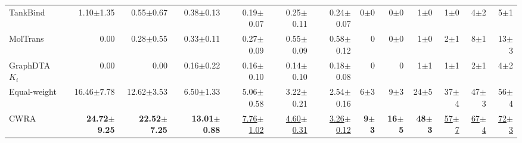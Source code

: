 \begin{table}[htbp!]
\begin{tabular}{lrrrrrr|rrrrrr}
TankBind & 1.10$\pm$1.35 & 0.55$\pm$0.67 & 0.38$\pm$0.13 & 0.19$\pm$0.07 & 0.25$\pm$0.11 & 0.24$\pm$0.07 & 0$\pm$0 & 0$\pm$0 & 1$\pm$0 & 1$\pm$0 & 4$\pm$2 & 5$\pm$1 \\
MolTrans & 0.00 & 0.28$\pm$0.55 & 0.33$\pm$0.11 & 0.27$\pm$0.09 & 0.55$\pm$0.09 & 0.58$\pm$0.12 & 0 & 0$\pm$0 & 1$\pm$0 & 2$\pm$1 & 8$\pm$1 & 13$\pm$3 \\
GraphDTA $K_{i}$ & 0.00 & 0.00 & 0.16$\pm$0.22 & 0.16$\pm$0.10 & 0.14$\pm$0.10 & 0.18$\pm$0.08 & 0 & 0 & 1$\pm$1 & 1$\pm$1 & 2$\pm$1 & 4$\pm$2 \\
\midrule
Equal-weight & 16.46$\pm$7.78 & 12.62$\pm$3.53 & 6.50$\pm$1.33 & 5.06$\pm$0.58 & 3.22$\pm$0.21 & 2.54$\pm$0.16 & 6$\pm$3 & 9$\pm$3 & 24$\pm$5 & 37$\pm$4 & 47$\pm$3 & 56$\pm$4 \\
CWRA & \textbf{24.72$\pm$9.25} & \textbf{22.52$\pm$7.25} & \textbf{13.01$\pm$0.88} & \underline{7.76$\pm$1.02} & \underline{4.60$\pm$0.31} & \underline{3.26$\pm$0.12} & \textbf{9$\pm$3} & \textbf{16$\pm$5} & \textbf{48$\pm$3} & \underline{57$\pm$7} & \underline{67$\pm$4} & \underline{72$\pm$3} \\
\bottomrule
\end{tabular}
\end{table}